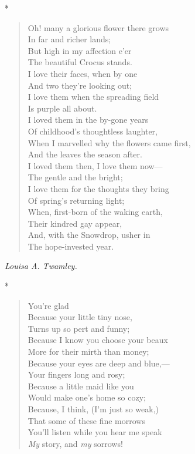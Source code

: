 \documentclass[11pt,twoside]{article}
\newcommand\stars{\begin{center}*\quad*\quad*\end{center}}
\newcommand\by[1]{\par\hfill\textit{#1}\par}
\begin{document}
\stars

\begin{verse}
Oh! many a glorious flower there grows\\
\quad In far and richer lands;\\
But high in my affection e’er\\
\quad The beautiful Crocus stands.\\
I love their faces, when by one\\
\quad And two they’re looking out;\\
I love them when the spreading field\\
\quad Is purple all about.\\
I loved them in the by-gone years\\
\quad Of childhood’s thoughtless laughter,\\
When I marvelled why the flowers came first,\\
\quad And the leaves the season after.\\
I loved them then, I love them now---\\
\quad The gentle and the bright;\\
I love them for the thoughts they bring\\
\quad Of spring’s returning light;\\
When, first-born of the waking earth,\\
\quad Their kindred gay appear,\\
And, with the Snowdrop, usher in\\
\quad The hope-invested year.
\end{verse}

\by{Louisa A. Twamley.}

\stars

\begin{verse}
\quad You’re glad\\
Because your little tiny nose,\\
\quad Turns up so pert and funny;\\
Because I know you choose your beaux\\
\quad More for their mirth than money;\\
Because your eyes are deep and blue,---\\
\quad Your fingers long and rosy;\\
Because a little maid like you\\
\quad Would make one’s home so cozy;\\
Because, I think, (I’m just so weak,)\\
\quad That some of these fine morrows\\
You’ll listen while you hear me speak\\
\quad \emph{My} story, and \emph{my} sorrows!
\end{verse}
\end{document}
